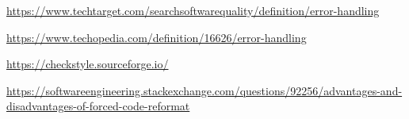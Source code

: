 \documentclass[a4paper, 12pt]{article}
\begin{document}
\newpage
\begin{thebibliography}{15}

\href{https://www.techtarget.com/searchsoftwarequality/definition/error-handling}{https://www.techtarget.com/searchsoftwarequality/definition/error-handling}

\href{https://www.techopedia.com/definition/16626/error-handling}{https://www.techopedia.com/definition/16626/error-handling}

\href{https://checkstyle.sourceforge.io/}{https://checkstyle.sourceforge.io/}

\href{https://softwareengineering.stackexchange.com/questions/92256/advantages-and-disadvantages-of-forced-code-reformat}{https://softwareengineering.stackexchange.com/questions/92256/advantages-and-disadvantages-of-forced-code-reformat}

\end{thebibliography}
\end{document}
